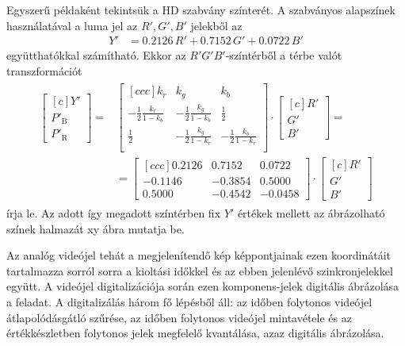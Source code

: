 Egyszerű példaként tekintsük a HD szabvány színterét.
A szabványos alapszínek használatával a luma jel az $R',G',B'$ jelekből az
\begin{align}
Y' &= 0.2126 \, R' + 0.7152 \, G' + 0.0722 \, B'
\end{align}
együtthatókkal számítható.
Ekkor az $R'G'B'$-színtérből a \ypbpr térbe valót transzformációt
\begin{align}
\begin{split}
\begin{bmatrix}[c]
       Y' \\[0.3em]
       P'_\mathrm{B} \\[0.3em]
       P'_{\mathrm{R}} \end{bmatrix}
       =& 
  \begin{bmatrix}[c c c]
   k_r & k_g & k_b  \\
   -\frac{1}{2}\frac{k_r}{1-k_b} & -\frac{1}{2}\frac{k_g}{1-k_b} & \frac{1}{2} \\
   \frac{1}{2}& -\frac{1}{2}\frac{k_g}{1-k_r} & -\frac{1}{2}\frac{k_b}{1-k_r} \\
\end{bmatrix}
\cdot
\begin{bmatrix}[c]
       R' \\[0.3em]
       G' \\[0.3em]
       B' \end{bmatrix} = \\
&=  \begin{bmatrix}[c c c]
   0.2126  &  0.7152 & 0.0722 \\
   -0.1146 & -0.3854 &  0.5000 \\
    0.5000 & -0.4542 & -0.0458
\end{bmatrix}
\cdot
\begin{bmatrix}[c]
       R' \\[0.3em]
       G' \\[0.3em]
       B' \end{bmatrix} 
\end{split}
\end{align}
írja le.
Az adott így megadott \ypbpr színtérben fix $Y'$ értékek mellett az ábrázolható színek halmazát xy ábra mutatja be.

Az analóg videójel tehát a megjelenítendő kép képpontjainak ezen \ypbpr koordinátáit tartalmazza sorról sorra a kioltási időkkel és az ebben jelenlévő szinkronjelekkel együtt.
A videójel digitalizációja során ezen komponens-jelek digitális ábrázolása a feladat.
A digitalizálás három fő lépésből áll: az időben folytonos videójel átlapolódásgátló szűrése, az időben folytonos videójel mintavétele és az értékkészletben folytonos jelek megfelelő kvantálása, azaz digitális ábrázolása.

